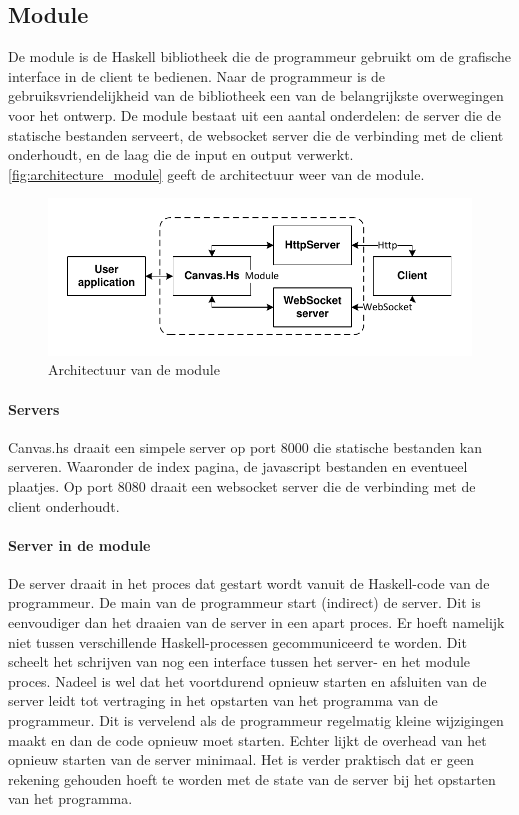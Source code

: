 \subsection{Module}
De module is de Haskell bibliotheek die de programmeur gebruikt om de grafische interface in de client te bedienen. Naar de programmeur is de gebruiksvriendelijkheid van de bibliotheek een van de belangrijkste overwegingen voor het ontwerp. De module bestaat uit een aantal onderdelen: de server die de statische bestanden serveert, de websocket server die de verbinding met de client onderhoudt, en de laag die de input en output verwerkt. \autoref{fig:architecture_module} geeft de architectuur weer van de module.

\begin{figure}
\begin{center}
\includegraphics[keepaspectratio,width=\textwidth]{./images/module_architecture.pdf}
\caption{Architectuur van de module}
\label{fig:architecture_module}
\end{center}
\end{figure}

\paragraph{Servers}
Canvas.hs draait een simpele server op port 8000 die statische bestanden kan serveren. Waaronder de index pagina, de javascript bestanden en eventueel plaatjes. Op port 8080 draait een websocket server die de verbinding met de client onderhoudt.


\paragraph{Server in de module}
De server draait in het proces dat gestart wordt vanuit de Haskell-code van de programmeur. De main van de programmeur start (indirect) de server. Dit is eenvoudiger dan het draaien van de server in een apart proces. Er hoeft namelijk niet tussen verschillende Haskell-processen gecommuniceerd te worden. Dit scheelt het schrijven van nog een interface tussen het server- en het module proces. Nadeel is wel dat het voortdurend opnieuw starten en afsluiten van de server leidt tot vertraging in het opstarten van het programma van de programmeur. Dit is vervelend als de programmeur regelmatig kleine wijzigingen maakt en dan de code opnieuw moet starten. Echter lijkt de overhead van het opnieuw starten van de server minimaal. Het is verder praktisch dat er geen rekening gehouden hoeft te worden met de state van de server bij het opstarten van het programma.

